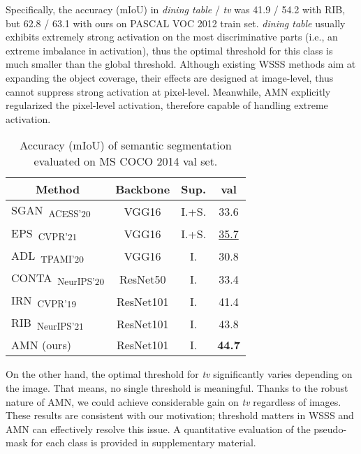 \documentclass[10pt,twocolumn,letterpaper]{article}
\begin{document}
Specifically, the accuracy (mIoU) in \textit{dining table} / \textit{tv} was 41.9 / 54.2 with RIB, but 62.8 / 63.1 with ours on PASCAL VOC 2012 train set. \textit{dining table} usually exhibits extremely strong activation on the most discriminative parts (i.e., an extreme imbalance in activation), thus the optimal threshold for this class is much smaller than the global threshold. Although existing WSSS methods aim at expanding the object coverage, their effects are designed at image-level, thus cannot suppress strong activation at pixel-level. Meanwhile, AMN explicitly regularized the pixel-level activation, therefore capable of handling extreme activation. 

\begin{table}[]
\centering
{\small
\begin{tabular}{@{}lccc@{}}
\toprule
\multicolumn{1}{c}{Method}        &Backbone     &Sup.           & val \\ \midrule
\multicolumn{1}{l}{SGAN~\cite{yao2020saliency}\textsubscript{ACESS'20}}
            &VGG16      &I.+S.  & 33.6 \\
\multicolumn{1}{l}{EPS~\cite{Lee_2021_CVPR}\textsubscript{CVPR'21}}
            &VGG16      &I.+S.  & \underline{35.7} \\ \midrule
\multicolumn{1}{l}{ADL~\cite{choe2020attention}\textsubscript{TPAMI'20}}     
            &VGG16      &I.     & 30.8 \\
\multicolumn{1}{l}{CONTA~\cite{zhang2020causal}\textsubscript{NeurIPS'20}}
            &ResNet50   &I.     & 33.4 \\
\multicolumn{1}{l}{IRN~\cite{ahn2019weakly}\textsubscript{CVPR'19}}
            &ResNet101  &I.     & 41.4 \\
\multicolumn{1}{l}{RIB~\cite{lee2021reducing}\textsubscript{NeurIPS'21}}
            &ResNet101  &I.     & 43.8 \\ \midrule
\multicolumn{1}{l}{AMN (ours)}
            &ResNet101  &I.     & \textbf{44.7} \\ \bottomrule
\end{tabular}
}
\vspace{-2mm}
\caption{Accuracy (mIoU) of semantic segmentation evaluated on MS COCO 2014 val set.}
\label{tab:seg_coco}
\vspace{-5mm}
\end{table} 
On the other hand, the optimal threshold for \textit{tv} significantly varies depending on the image. That means, no single threshold is meaningful. Thanks to the robust nature of AMN, we could achieve considerable gain on \textit{tv} regardless of images. These results are consistent with our motivation; threshold matters in WSSS and AMN can effectively resolve this issue. A quantitative evaluation of the pseudo-mask for each class is provided in supplementary material.
\end{document}

